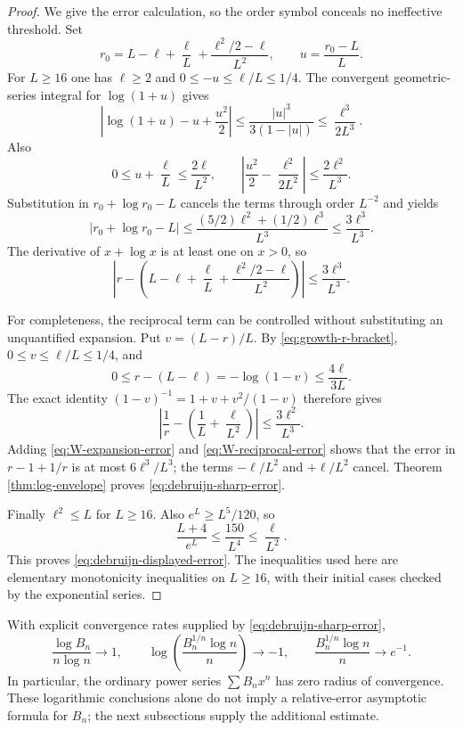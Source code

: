 \begin{proof}
We give the error calculation, so the order symbol conceals no
ineffective threshold.  Set
\[
 r_0=L-\ell+\frac\ell L+
             \frac{\ell^2/2-\ell}{L^2},\qquad
 u=\frac{r_0-L}{L}.
\]
For $L\geq16$ one has $\ell\geq2$ and $0\leq-u\leq\ell/L\leq1/4$.
The convergent geometric-series integral for $\log(1+u)$ gives
\[
 \left|\log(1+u)-u+\frac{u^2}{2}\right|
 \leq\frac{|u|^3}{3(1-|u|)}
 \leq\frac{\ell^3}{2L^3}.
\]
Also
\[
 0\leq u+\frac\ell L\leq\frac{2\ell}{L^2},\qquad
 \left|\frac{u^2}{2}-\frac{\ell^2}{2L^2}\right|
 \leq\frac{2\ell^2}{L^3}.
\]
Substitution in $r_0+\log r_0-L$ cancels the terms through order
$L^{-2}$ and yields
\[
 |r_0+\log r_0-L|
 \leq\frac{(5/2)\ell^2+(1/2)\ell^3}{L^3}
 \leq\frac{3\ell^3}{L^3}.
\]
The derivative of $x+\log x$ is at least one on $x>0$, so
\begin{equation}\label{eq:W-expansion-error}
 \left|r-\left(L-\ell+\frac\ell L+
             \frac{\ell^2/2-\ell}{L^2}\right)\right|
 \leq\frac{3\ell^3}{L^3}.
\end{equation}

For completeness, the reciprocal term can be controlled without
substituting an unquantified expansion.  Put $v=(L-r)/L$.
By \eqref{eq:growth-r-bracket}, $0\leq v\leq\ell/L\leq1/4$, and
\[
 0\leq r-(L-\ell)=-\log(1-v)
 \leq\frac{4\ell}{3L}.
\]
The exact identity $(1-v)^{-1}=1+v+v^2/(1-v)$ therefore gives
\begin{equation}\label{eq:W-reciprocal-error}
 \left|\frac1r-\left(\frac1L+\frac\ell{L^2}\right)\right|
 \leq\frac{3\ell^2}{L^3}.
\end{equation}
Adding \eqref{eq:W-expansion-error} and
\eqref{eq:W-reciprocal-error} shows that the error in
$r-1+1/r$ is at most $6\ell^3/L^3$; the terms
$-\ell/L^2$ and $+\ell/L^2$ cancel.  Theorem
\ref{thm:log-envelope} proves
\eqref{eq:debruijn-sharp-error}.

Finally $\ell^2\leq L$ for $L\geq16$.  Also $e^L\geq L^5/120$,
so
\[
 \frac{L+4}{e^L}\leq\frac{150}{L^4}
 \leq\frac\ell{L^2}.
\]
This proves \eqref{eq:debruijn-displayed-error}.  The inequalities used
here are elementary monotonicity inequalities on $L\geq16$, with
their initial cases checked by the exponential series.
\end{proof}

\begin{corollary}
\label{cor:root-growth}
With explicit convergence rates supplied by
\eqref{eq:debruijn-sharp-error},
\[
 \frac{\log B_n}{n\log n}\longrightarrow1,
 \qquad
 \log\left(\frac{B_n^{1/n}\log n}{n}\right)
 \longrightarrow-1,
 \qquad
 \frac{B_n^{1/n}\log n}{n}\longrightarrow e^{-1}.
\]
In particular, the ordinary power series $\sum B_nx^n$ has zero
radius of convergence.  These logarithmic conclusions alone do not
imply a relative-error asymptotic formula for $B_n$; the next
subsections supply the additional estimate.
\end{corollary}

